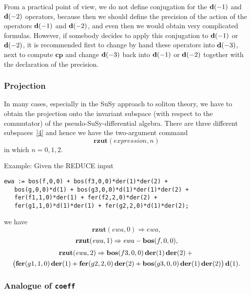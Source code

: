 {From a practical point of view, we do not define conjugation for the
$\mathbf{d}(-1)$ and $\mathbf{d}(-2)$ operators, because then we should define the
precision of the action of the operators $\mathbf{d}(-1)$ and $\mathbf{d}(-2)$, and
even then we would obtain very complicated formulas.  However, if
somebody decides to apply this conjugation to $\mathbf{d}(-1)$ or $\mathbf{d}(-2)$, it
is recommended first to change by hand these operators into $\mathbf{d}(-3)$,
next to compute $\mathbf{cp}$ and change $\mathbf{d}(-3)$ back into $\mathbf{d}(-1)$
or $\mathbf{d}(-2)$ together with the declaration of the precision.

\subsubsection*{Projection}

In many cases, especially in the SuSy approach to soliton theory, we
have to obtain the projection onto the invariant subspace (with
respect to the commutator) of the pseudo-SuSy-differential algebra.
There are three different subspaces~\hyperlink{susy2-bib}{[4]} and
hence we have the two-argument command
\begin{equation*}
  \mathbf{rzut}(\mathit{expression},n)
\end{equation*}
in which $n=0,1,2$.

Example: Given the REDUCE input
\begin{verbatim}
ewa := bos(f,0,0) + bos(f3,0,0)*der(1)*der(2) +
   bos(g,0,0)*d(1) + bos(g3,0,0)*d(1)*der(1)*der(2) +
   fer(f1,1,0)*der(1) + fer(f2,2,0)*der(2) +
   fer(g1,1,0)*d(1)*der(1) + fer(g2,2,0)*d(1)*der(2);
\end{verbatim}
we have
\begin{equation*}
  \mathbf{rzut}(\mathit{ewa},0) \Rightarrow \mathit{ewa},
\end{equation*}
\begin{equation*}
  \mathbf{rzut}(\mathit{ewa},1) \Rightarrow \mathit{ewa}-\mathbf{bos}(f,0,0),
\end{equation*}
\begin{multline*}
  \mathbf{rzut}(\mathit{ewa},2) \Rightarrow
  \mathbf{bos}(f3,0,0)\,\mathbf{der}(1)\,\mathbf{der}(2) + \mbox{} \\
  \big( \mathbf{fer}(g1,1,0)\,\mathbf{der}(1) + \mathbf{fer}(g2,2,0)\,\mathbf{der}(2) +
  \mathbf{bos}(g3,0,0)\,\mathbf{der}(1)\,\mathbf{der}(2) \big)\,\mathbf{d}(1).
\end{multline*}

\subsubsection*{Analogue of \texttt{coeff}}

}
